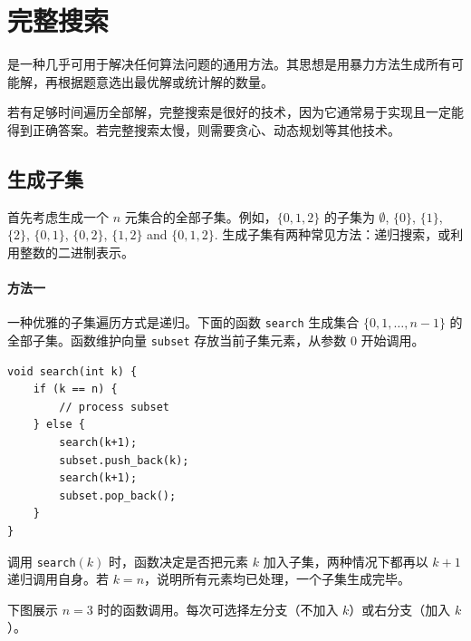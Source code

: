 \chapter{完整搜索}

是一种几乎可用于解决任何算法问题的通用方法。其思想是用暴力方法生成所有可能解，再根据题意选出最优解或统计解的数量。

若有足够时间遍历全部解，完整搜索是很好的技术，因为它通常易于实现且一定能得到正确答案。若完整搜索太慢，则需要贪心、动态规划等其他技术。

\section{生成子集}


首先考虑生成一个 $n$ 元集合的全部子集。例如，$\{0,1,2\}$ 的子集为
$\emptyset$, $\{0\}$, $\{1\}$, $\{2\}$, $\{0,1\}$,
$\{0,2\}$, $\{1,2\}$ and $\{0,1,2\}$.
生成子集有两种常见方法：递归搜索，或利用整数的二进制表示。

\subsubsection{方法一}

一种优雅的子集遍历方式是递归。下面的函数 \texttt{search} 生成集合 $\{0,1,\ldots,n-1\}$ 的全部子集。函数维护向量 \texttt{subset} 存放当前子集元素，从参数 0 开始调用。

\begin{lstlisting}
void search(int k) {
    if (k == n) {
        // process subset
    } else {
        search(k+1);
        subset.push_back(k);
        search(k+1);
        subset.pop_back();
    }
}
\end{lstlisting}

调用 \texttt{search}$(k)$ 时，函数决定是否把元素 $k$ 加入子集，两种情况下都再以 $k+1$ 递归调用自身。若 $k=n$，说明所有元素均已处理，一个子集生成完毕。

下图展示 $n=3$ 时的函数调用。每次可选择左分支（不加入 $k$）或右分支（加入 $k$）。

